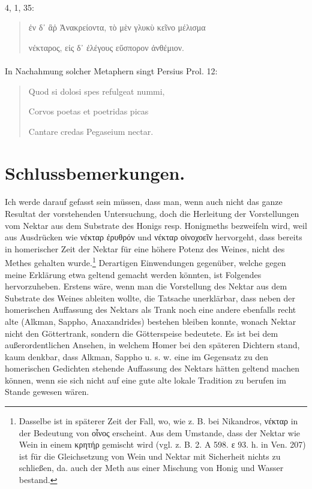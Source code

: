 \documentclass[a4paper, 11pt, oneside]{article}
\begin{document}
\paragraph{}
4, 1, 35:
\begin{quotation}
ἐν δ᾽ ἃῥ Ἀνακρείοντα, τὸ μὲν γλυκὺ κεῖνο μέλισμα

νέκταρος, εἰς δ᾽ ἐλέγους εὔσπορον ἀνθέμιον.
\end{quotation}
\paragraph{}
In Nachahmung solcher Metaphern singt Persius Prol. 12:
\begin{quotation}
Quod si dolosi spes refulgeat nummi,

Corvos poetas et poetridas picas

Cantare credas Pegaseium nectar.
\end{quotation}
\paragraph{}
\clearpage
\section{Schlussbemerkungen.}
\paragraph{}
Ich werde darauf gefasst sein müssen, dass man, wenn auch nicht das ganze Resultat der vorstehenden Untersuchung, doch die Herleitung der Vorstellungen vom Nektar aus dem Substrate des Honigs resp. Honigmeths bezweifeln wird, weil aus Ausdrücken wie νέκταρ ἐρυθρόν und νέκταρ οἰνοχοεῖν hervorgeht, dass bereits in homerischer Zeit der Nektar für eine höhere Potenz des Weines, nicht des Methes gehalten wurde.\footnote{Dasselbe ist in späterer Zeit der Fall, wo, wie z. B. bei Nikandros, νέκταρ in der Bedeutung von οἶνος erscheint. Aus dem Umstande, dass der Nektar wie Wein in einem κρητήρ gemischt wird (vgl. z. B. 2. A 598. ε 93. h. in Ven. 207) ist für die Gleichsetzung von Wein und Nektar mit Sicherheit nichts zu schließen, da. auch der Meth aus einer Mischung von Honig und Wasser bestand.} Derartigen Einwendungen gegenüber, welche gegen meine Erklärung etwa geltend gemacht werden könnten, ist Folgendes hervorzuheben. Erstens wäre, wenn man die Vorstellung des Nektar aus dem Substrate des Weines ableiten wollte, die Tatsache unerklärbar, dass neben der homerischen Auffassung des Nektars als Trank noch eine andere ebenfalls recht alte (Alkman, Sappho, Anaxandrides) bestehen bleiben konnte, wonach Nektar nicht den Göttertrank, sondern die Götterspeise bedeutete. Es ist bei dem außerordentlichen Ansehen, in welchem Homer bei den späteren Dichtern stand, kaum denkbar, dass Alkman, Sappho u. s. w. eine im Gegensatz zu den homerischen Gedichten stehende Auffassung des Nektars hätten geltend machen können, wenn sie sich nicht auf eine gute alte lokale Tradition zu berufen im Stande gewesen wären.
\end{document}
